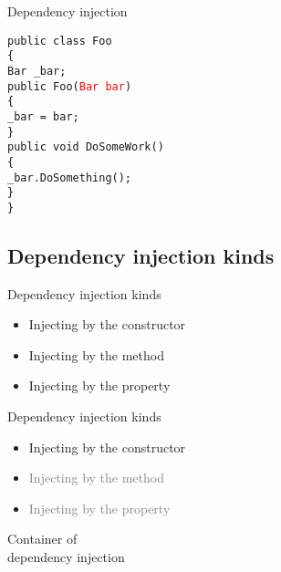 \documentclass{beamer}
\newcommand{\code}[1]{{\texttt{#1}}}
\begin{document}
\begin{frame}{Dependency injection}
     \begin{large}
	\code{public class Foo}\\
	\code{\{}\\ \quad
		\code{Bar \_bar;}\\ \quad
		\code{public Foo(\textcolor{red}{Bar bar})}\\ \quad
		\code{\{}\\ \qquad
		\code{\_bar = bar;}\\ \quad
		\code{\}}\\ \quad
		\code{public void DoSomeWork()}\\ \quad
		\code{\{}\\ \qquad
		\code{\_bar.DoSomething();}\\ \quad
		\code{\}}\\
	\code{\}}
     \end{large}
\end{frame}

\subsection*{Dependency injection kinds}

\begin{frame}{Dependency injection kinds}
     \begin{Large}
	\begin{itemize}
		\item Injecting by the constructor
		\item Injecting by the method
		\item Injecting by the property
	\end{itemize}
     \end{Large}
\end{frame}

\begin{frame}{Dependency injection kinds}
     \begin{Large}
	\begin{itemize}
		\item Injecting by the constructor
		\item \textcolor{gray}{Injecting by the method}
		\item \textcolor{gray}{Injecting by the property}
	\end{itemize}
     \end{Large}
\end{frame}

\begin{frame}{}
	\begin{center}
		\Huge{Container of\\ dependency injection}
	\end{center}
\end{frame}
\end{document}
